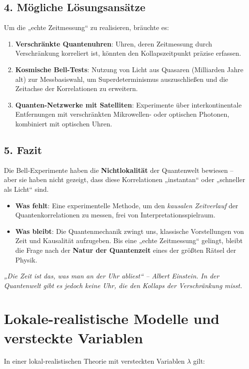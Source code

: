 \documentclass[12pt,a4paper]{article}
\begin{document}
\subsection{4. Mögliche Lösungsansätze}
Um die „echte Zeitmessung“ zu realisieren, bräuchte es:
\begin{enumerate}
    \item \textbf{Verschränkte Quantenuhren}: Uhren, deren Zeitmessung durch Verschränkung korreliert ist, könnten den Kollapszeitpunkt präzise erfassen.
    \item \textbf{Kosmische Bell-Tests}: Nutzung von Licht aus Quasaren (Milliarden Jahre alt) zur Messbasiswahl, um Superdeterminismus auszuschließen und die Zeitachse der Korrelationen zu erweitern.
    \item \textbf{Quanten-Netzwerke mit Satelliten}: Experimente über interkontinentale Entfernungen mit verschränkten Mikrowellen- oder optischen Photonen, kombiniert mit optischen Uhren.
\end{enumerate}

\subsection{5. Fazit}
Die Bell-Experimente haben die \textbf{Nichtlokalität} der Quantenwelt bewiesen – aber sie haben nicht gezeigt, dass diese Korrelationen „instantan“ oder „schneller als Licht“ sind.
\begin{itemize}
    \item \textbf{Was fehlt}: Eine experimentelle Methode, um den \textit{kausalen Zeitverlauf} der Quantenkorrelationen zu messen, frei von Interpretationsspielraum.
    \item \textbf{Was bleibt}: Die Quantenmechanik zwingt uns, klassische Vorstellungen von Zeit und Kausalität aufzugeben. Bis eine „echte Zeitmessung“ gelingt, bleibt die Frage nach der \textbf{Natur der Quantenzeit} eines der größten Rätsel der Physik.
\end{itemize}

\textit{„Die Zeit ist das, was man an der Uhr abliest“ – Albert Einstein.  
In der Quantenwelt gibt es jedoch keine Uhr, die den Kollaps der Verschränkung misst.}

\section{Lokale-realistische Modelle und versteckte Variablen}
	In einer lokal-realistischen Theorie mit versteckten Variablen $\lambda$ gilt:
	
\end{document}
